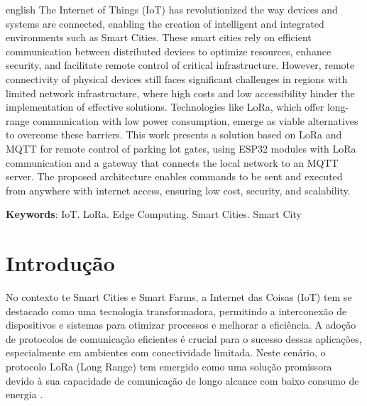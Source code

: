 \documentclass[
article,			%
11pt,				%
twoside,			%
a4paper,			%
section=TITLE,		%
onecolumn,          %
english,			%
brazil,				%
sumario=tradicional
]{abntex2}
\begin{document}
    \renewcommand{\resumoname}{Abstract}
    \begin{resumo}
        \begin{otherlanguage*}{english}
            The Internet of Things (IoT) has revolutionized the way devices and systems are connected, enabling the creation of intelligent and integrated environments such as Smart Cities. These smart cities rely on efficient communication between distributed devices to optimize resources, enhance security, and facilitate remote control of critical infrastructure. However, remote connectivity of physical devices still faces significant challenges in regions with limited network infrastructure, where high costs and low accessibility hinder the implementation of effective solutions. Technologies like LoRa, which offer long-range communication with low power consumption, emerge as viable alternatives to overcome these barriers. This work presents a solution based on LoRa and MQTT for remote control of parking lot gates, using ESP32 modules with LoRa communication and a gateway that connects the local network to an MQTT server. The proposed architecture enables commands to be sent and executed from anywhere with internet access, ensuring low cost, security, and scalability.
            
            \noindent
            \textbf{Keywords}: IoT. LoRa. Edge Computing. Smart Cities. Smart City
        \end{otherlanguage*}  
    \end{resumo}
    
    
    \vspace{\onelineskip}%
    
    
    
    \textual
    
    \section{Introdução}
    
    No contexto te Smart Cities e Smart Farms, a Internet das Coisas (IoT) tem se destacado como uma tecnologia transformadora, permitindo a interconexão de dispositivos e sistemas para otimizar processos e melhorar a eficiência. A adoção de protocolos de comunicação eficientes é crucial para o sucesso dessas aplicações, especialmente em ambientes com conectividade limitada. Neste cenário, o protocolo LoRa (Long Range) tem emergido como uma solução promissora devido à sua capacidade de comunicação de longo alcance com baixo consumo de energia \cite{Yoon2020}.
\end{document}
